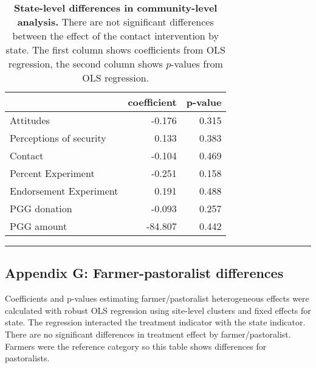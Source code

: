 \documentclass[
]{article}
\begin{document}
\begin{table}[H]
\begin{center}
\label{tab:state_tab}
\caption{\textbf{State-level differences in community-level analysis.} There are not significant differences between the effect of the contact intervention by state. The first column shows coefficients from OLS regression, the second column shows $p$-values from OLS regression.}
\smallskip

\begin{tabular}{l|r|r}
\hline
  & coefficient & p-value\\
\hline
Attitudes & -0.176 & 0.315\\
\hline
Perceptions of security & 0.133 & 0.383\\
\hline
Contact & -0.104 & 0.469\\
\hline
Percent Experiment & -0.251 & 0.158\\
\hline
Endorsement Experiment & 0.191 & 0.488\\
\hline
PGG donation & -0.093 & 0.257\\
\hline
PGG amount & -84.807 & 0.442\\
\hline
\end{tabular}


\end{center}
\end{table}

\begin{center}\rule{0.5\linewidth}{0.5pt}\end{center}

\hypertarget{appendix-g-farmer-pastoralist-differences}{%
\subsection{Appendix G: Farmer-pastoralist
differences}\label{appendix-g-farmer-pastoralist-differences}}

Coefficients and p-values estimating farmer/pastoralist heterogeneous
effects were calculated with robust OLS regression using site-level
clusters and fixed effects for state. The regression interacted the
treatment indicator with the state indicator. There are no significant
differences in treatment effect by farmer/pastoralist. Farmers were the
reference category so this table shows differences for pastoralists.
\end{document}
